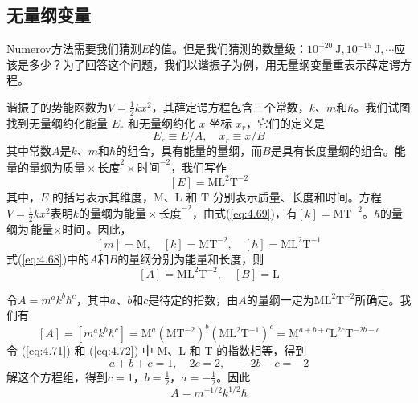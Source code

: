 \subsection*{无量纲变量}
    Numerov方法需要我们猜测$E$的值。但是我们猜测的数量级：$10^{-20} \: \mathrm{J},10^{-15} \: \mathrm{J},\cdots$应该是多少？为了回答这个问题，我们以谐振子为例，用无量纲变量重表示薛定谔方程。

    谐振子的势能函数为$V = \frac{1}{2}kx^2$，其薛定谔方程包含三个常数，$k$、$m$和$\hbar$。我们试图找到无量纲约化能量 $E_r$ 和无量纲约化 $x$ 坐标 $x_r$，它们的定义是
    \begin{equation}
        E_r \equiv E/A, \quad x_r \equiv x/B
        \label{eq:4.68}
    \end{equation}
    其中常数$A$是$k$、$m$和$\hbar$的组合，具有能量的量纲，而$B$是具有长度量纲的组合。能量的量纲为$\text{质量}\times\text{长度}^2\times\text{时间}^{-2}$，我们写作
    \begin{equation}
        \left[E\right] = \mathrm{M}\mathrm{L}^2\mathrm{T}^{-2}
        \label{eq:4.69}
    \end{equation}
    其中，$E$ 的括号表示其维度，$\mathrm{M}$、$\mathrm{L}$ 和 $\mathrm{T}$ 分别表示质量、长度和时间。方程$V = \frac{1}{2}kx^2$表明$k$的量纲为$\text{能量}\times\text{长度}^{-2}$，由式(\ref{eq:4.69})，有$\left[k\right] = \mathrm{M}\mathrm{T}^{-2}$。$\hbar$的量纲为$\text{能量}\times\text{时间}$。因此，
    \begin{equation}
        \left[m\right] = \mathrm{M}, \quad \left[k\right] = \mathrm{M}\mathrm{T}^{-2}, \quad \left[\hbar\right] = \mathrm{M}\mathrm{L}^2\mathrm{T}^{-1}
        \label{eq:4.70}
    \end{equation}
    式(\ref{eq:4.68})中的$A$和$B$的量纲分别为能量和长度，则
    \begin{equation}
        \left[A\right] = \mathrm{M}\mathrm{L}^2\mathrm{T}^{-2}, \quad \left[B\right] = \mathrm{L}
        \label{eq:4.71}
    \end{equation}

    令$A = m^ak^b\hbar^c$，其中$a$、$b$和$c$是待定的指数，由$A$的量纲一定为$\mathrm{M}\mathrm{L}^2\mathrm{T}^{-2}$所确定。我们有
    \begin{equation}
        \left[A\right] = \left[m^ak^b\hbar^c\right] = \mathrm{M}^a\left(\mathrm{M}\mathrm{T}^{-2}\right)^b\left(\mathrm{M}\mathrm{L}^2\mathrm{T}^{-1}\right)^c = \mathrm{M}^{a+b+c}\mathrm{L}^{2c}\mathrm{T}^{-2b-c}
        \label{eq:4.72}
    \end{equation}
    令 (\ref{eq:4.71}) 和 (\ref{eq:4.72}) 中 M、L 和 T 的指数相等，得到
    \begin{equation*}
        a+b+c = 1, \quad 2c = 2, \quad -2b-c = -2
    \end{equation*}
    解这个方程组，得到$c=1$，$b=\frac{1}{2}$，$a=-\frac{1}{2}$。因此
    \begin{equation}
        A = m^{-1/2}k^{1/2}\hbar
        \label{eq:4.73}
    \end{equation}

